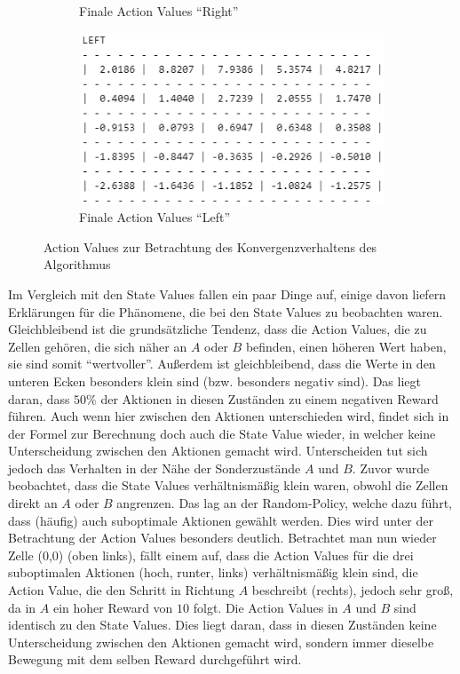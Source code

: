 \documentclass[11pt]{article}
\begin{document}
\begin{figure}
\begin{subfigure}[b]{0.49\textwidth}
        \caption{Finale Action Values ``Right''}
        \label{img:2_1_b2_right}
    \end{subfigure}
    \hfill
    \begin{subfigure}[b]{0.49\textwidth}
        \centering
        \includegraphics[width=\textwidth]{img/img_2_1_b_left.png}
        \caption{Finale Action Values ``Left''}
        \label{img:2_1_b2_left}
    \end{subfigure}
    \caption{Action Values zur Betrachtung des Konvergenzverhaltens des Algorithmus}
    \label{img:2_1_b2}
\end{figure}

Im Vergleich mit den State Values fallen ein paar Dinge auf, einige davon liefern Erklärungen für die Phänomene, die bei den State Values zu beobachten waren. Gleichbleibend ist die grundsätzliche Tendenz, dass die Action Values, die zu Zellen gehören, die sich näher an $A$ oder $B$ befinden, einen höheren Wert haben, sie sind somit ``wertvoller''. Außerdem ist gleichbleibend, dass die Werte in den unteren Ecken besonders klein sind (bzw. besonders negativ sind). Das liegt daran, dass $50\%$ der Aktionen in diesen Zuständen zu einem negativen Reward führen. Auch wenn hier zwischen den Aktionen unterschieden wird, findet sich in der Formel zur Berechnung doch auch die State Value wieder, in welcher keine Unterscheidung zwischen den Aktionen gemacht wird. Unterscheiden tut sich jedoch das Verhalten in der Nähe der Sonderzustände $A$
und $B$. Zuvor wurde beobachtet, dass die State Values verhältnismäßig klein waren, obwohl die Zellen direkt an $A$ oder $B$ angrenzen. Das lag an der Random-Policy, welche dazu führt, dass (häufig) auch suboptimale Aktionen gewählt werden. Dies wird unter der Betrachtung der Action Values besonders deutlich. Betrachtet man nun wieder Zelle (0,0) (oben links), fällt einem auf, dass die Action Values für die drei suboptimalen Aktionen (hoch, runter, links) verhältnismäßig klein sind, die Action Value, die den Schritt in Richtung $A$ beschreibt (rechts), jedoch sehr groß, da in $A$ ein hoher Reward von $10$ folgt. Die Action Values in $A$ und $B$ sind identisch zu den State Values. Dies liegt daran, dass in diesen Zuständen keine Unterscheidung zwischen den Aktionen gemacht wird, sondern immer dieselbe Bewegung mit dem selben Reward durchgeführt wird.
\end{document}
